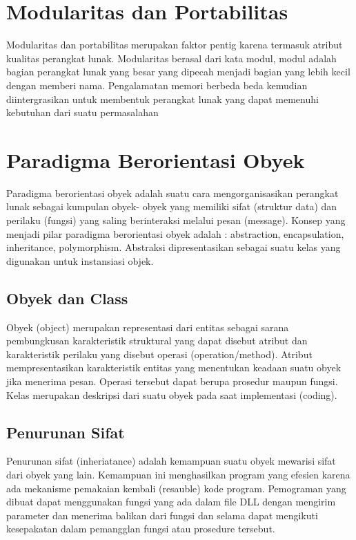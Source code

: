
\section{Modularitas dan Portabilitas}
Modularitas dan portabilitas merupakan faktor pentig karena termasuk atribut kualitas perangkat lunak. Modularitas berasal dari kata modul, modul adalah bagian perangkat lunak yang besar yang dipecah menjadi bagian yang lebih kecil dengan memberi nama. Pengalamatan memori berbeda beda kemudian diintergrasikan untuk membentuk perangkat lunak yang dapat memenuhi kebutuhan dari suatu permasalahan

\section{Paradigma Berorientasi Obyek}
Paradigma berorientasi obyek adalah suatu cara mengorganisasikan perangkat lunak sebagai kumpulan obyek- obyek yang memiliki sifat (struktur data) dan perilaku (fungsi) yang saling berinteraksi melalui pesan (message). Konsep yang menjadi pilar paradigma berorientasi obyek adalah : abstraction, encapsulation, inheritance, polymorphism. Abstraksi dipresentasikan sebagai suatu kelas yang digunakan untuk instansiasi objek.

\subsection{Obyek dan Class}
Obyek (object) merupakan representasi dari entitas sebagai sarana pembungkusan karakteristik struktural
yang dapat disebut atribut dan karakteristik perilaku yang disebut operasi (operation/method). Atribut 
mempresentasikan karakteristik entitas yang menentukan keadaan suatu obyek jika menerima pesan.
Operasi tersebut dapat berupa prosedur maupun fungsi. Kelas merupakan deskripsi dari suatu obyek pada 
saat implementasi (coding).


\subsection{Penurunan Sifat}
Penurunan sifat (inheriatance) adalah kemampuan suatu obyek mewarisi sifat dari obyek yang lain. Kemampuan ini menghasilkan program yang efesien karena ada mekanisme pemakaian kembali (resauble) kode program. Pemograman yang dibuat dapat menggunakan fungsi yang ada dalam file DLL dengan mengirim parameter dan menerima balikan dari fungsi dan selama dapat mengikuti kesepakatan dalam pemangglan fungsi atau prosedure tersebut.


